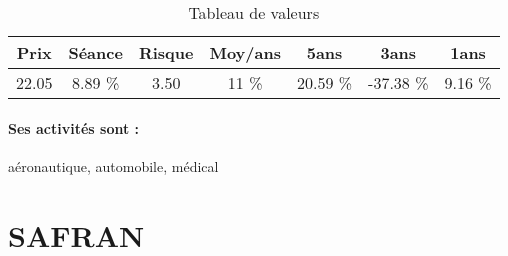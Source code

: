 \documentclass[11pt,a4paper]{report}%
\begin{document}
\begin{table}[H]
  \centering
    \begin{tabular}{|c|c|c|c|c|c|c|}
    \hline
    Prix & Séance & Risque  & Moy/ans & 5ans & 3ans & 1ans \\
    \hline
    22.05 &    8.89 \%    & 3.50 & 11 \% & 20.59 \% & -37.38 \% & 9.16 \% \\
    \hline
    \end{tabular}%
        \label{tab:table_LISI}%
      \caption{Tableau de valeurs}
\end{table}%

\paragraph{Ses activités sont : } aéronautique, automobile, médical 
    
    \newpage

\section{SAFRAN}
\end{document}
